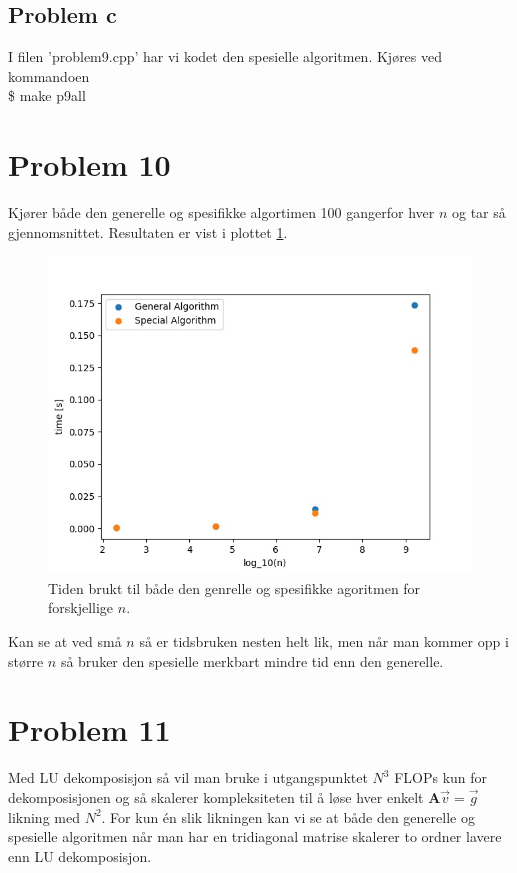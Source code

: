 \documentclass[english,notitlepage]{revtex4-1}  %
\begin{document}
\subsection*{Problem c}

I filen 'problem9.cpp' har vi kodet den spesielle algoritmen. Kjøres ved kommandoen \\

\$ make p9all



\section*{Problem 10}

Kjører både den generelle og spesifikke algortimen 100 gangerfor hver $n$ og tar så gjennomsnittet. Resultaten er vist i plottet \ref{timeplot}.

\begin{figure}[ht]
\centering
\includegraphics[scale=0.65]{Images/plottime.jpg}
\caption{Tiden brukt til både den genrelle og spesifikke agoritmen for forskjellige $n$.}
\label{timeplot}
\end{figure}

Kan se at ved små $n$ så er tidsbruken nesten helt lik, men når man kommer opp i større $n$ så bruker den spesielle merkbart mindre tid enn den generelle.

\section*{Problem 11}

Med LU dekomposisjon så vil man bruke i utgangspunktet $N^3$ FLOPs kun for dekomposisjonen og så skalerer kompleksiteten til å løse hver enkelt $\textbf{A}\vec{v}= \vec{g}$ likning med $N^2$. For kun én slik likningen kan vi se at både den generelle og spesielle algoritmen når man har en tridiagonal matrise skalerer to ordner lavere enn LU dekomposisjon.
\end{document}
